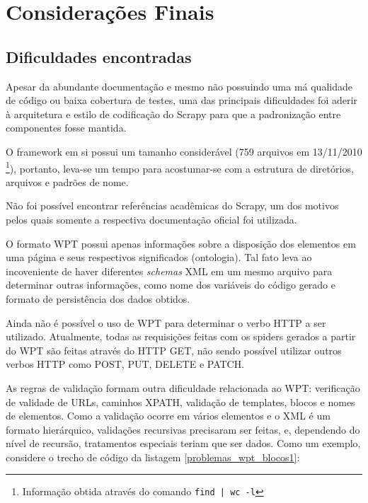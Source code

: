 


\pagebreak
\chapter{Considerações Finais}
\thispagestyle{fancy}

\section{Dificuldades encontradas}

Apesar da abundante documentação e mesmo não possuindo uma má qualidade de código ou baixa cobertura de testes, uma das principais dificuldades foi aderir à arquitetura e estilo de codificação do Scrapy para que a padronização entre componentes fosse mantida.

O framework em si possui um tamanho considerável (759 arquivos em 13/11/2010 \footnote{Informação obtida através do comando \texttt{find | wc -l} }), portanto, leva-se um tempo para acostumar-se com a estrutura de diretórios, arquivos e padrões de nome.

Não foi possível encontrar referências acadêmicas do Scrapy, um dos motivos pelos quais somente a respectiva documentação oficial foi utilizada.

O formato WPT possui apenas informações sobre a disposição dos elementos em uma página e seus respectivos significados (ontologia). Tal fato leva ao incoveniente de haver diferentes \emph{schemas} XML em um mesmo arquivo para determinar outras informações, como nome dos variáveis do código gerado e formato de persistência dos dados obtidos.

Ainda não é possível o uso de WPT para determinar o verbo HTTP a ser utilizado. Atualmente, todas as requisições feitas com os spiders gerados a partir do WPT são feitas através do HTTP GET, não sendo possível utilizar outros verbos HTTP como POST, PUT, DELETE e PATCH. 

As regras de validação formam outra dificuldade relacionada ao WPT: verificação de validade de URLs, caminhos XPATH, validação de templates, blocos e nomes de elementos. Como a validação ocorre em vários elementos e o XML é um formato hierárquico, validações recursivas precisaram ser feitas, e, dependendo do nível de recursão, tratamentos especiais teriam que ser dados. Como um exemplo, considere o trecho de código da listagem \ref{problemas_wpt_blocos1}:

